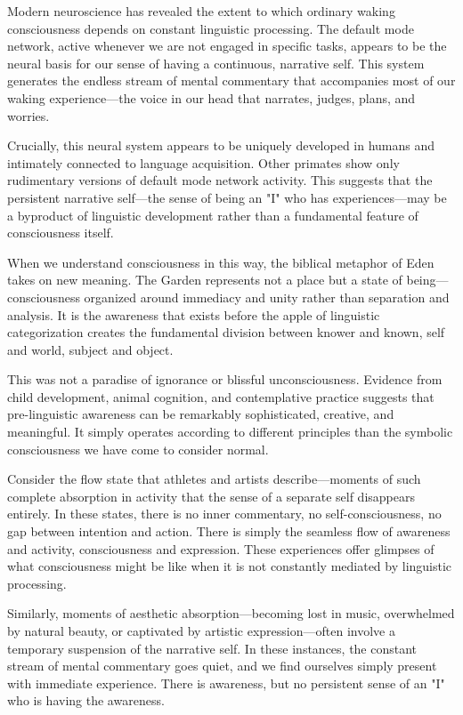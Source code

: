 Modern neuroscience has revealed the extent to which ordinary waking consciousness depends on constant linguistic processing. The default mode network, active whenever we are not engaged in specific tasks, appears to be the neural basis for our sense of having a continuous, narrative self. This system generates the endless stream of mental commentary that accompanies most of our waking experience—the voice in our head that narrates, judges, plans, and worries.

Crucially, this neural system appears to be uniquely developed in humans and intimately connected to language acquisition. Other primates show only rudimentary versions of default mode network activity. This suggests that the persistent narrative self—the sense of being an "I" who has experiences—may be a byproduct of linguistic development rather than a fundamental feature of consciousness itself.

When we understand consciousness in this way, the biblical metaphor of Eden takes on new meaning. The Garden represents not a place but a state of being—consciousness organized around immediacy and unity rather than separation and analysis. It is the awareness that exists before the apple of linguistic categorization creates the fundamental division between knower and known, self and world, subject and object.

This was not a paradise of ignorance or blissful unconsciousness. Evidence from child development, animal cognition, and contemplative practice suggests that pre-linguistic awareness can be remarkably sophisticated, creative, and meaningful. It simply operates according to different principles than the symbolic consciousness we have come to consider normal.

Consider the flow state that athletes and artists describe—moments of such complete absorption in activity that the sense of a separate self disappears entirely. In these states, there is no inner commentary, no self-consciousness, no gap between intention and action. There is simply the seamless flow of awareness and activity, consciousness and expression. These experiences offer glimpses of what consciousness might be like when it is not constantly mediated by linguistic processing.

Similarly, moments of aesthetic absorption—becoming lost in music, overwhelmed by natural beauty, or captivated by artistic expression—often involve a temporary suspension of the narrative self. In these instances, the constant stream of mental commentary goes quiet, and we find ourselves simply present with immediate experience. There is awareness, but no persistent sense of an "I" who is having the awareness.

